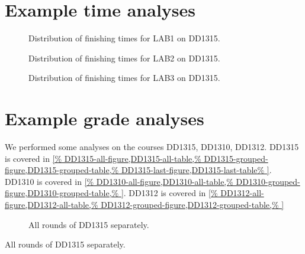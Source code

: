 \section{Example time analyses}

\begin{frame}
  \begin{figure}
    \caption{Distribution of finishing times for LAB1 on DD1315.}
    \label{DD1315-LAB1-time-fig}
  \end{figure}
\end{frame}

\begin{frame}
  \begin{figure}
    \caption{Distribution of finishing times for LAB2 on DD1315.}
    \label{DD1315-LAB2-time-fig}
  \end{figure}
\end{frame}

\begin{frame}
  \begin{figure}
    \caption{Distribution of finishing times for LAB3 on DD1315.}
    \label{DD1315-LAB3-time-fig}
  \end{figure}
\end{frame}


\section{Example grade analyses}

We performed some analyses on the courses DD1315, DD1310, DD1312.
DD1315 is covered in \cref{%
  DD1315-all-figure,DD1315-all-table,%
  DD1315-grouped-figure,DD1315-grouped-table,%
  DD1315-last-figure,DD1315-last-table%
}.
DD1310 is covered in \cref{%
  DD1310-all-figure,DD1310-all-table,%
  DD1310-grouped-figure,DD1310-grouped-table,%
}.
DD1312 is covered in \cref{%
  DD1312-all-figure,DD1312-all-table,%
  DD1312-grouped-figure,DD1312-grouped-table,%
}

\begin{frame}
\begin{figure}
\centering
%
\caption{All rounds of DD1315 separately.}
\label{DD1315-all-figure}
\end{figure}
\end{frame}

\begin{table}
\centering
%
\caption{All rounds of DD1315 separately.}
\label{DD1315-all-table}
\end{table}

